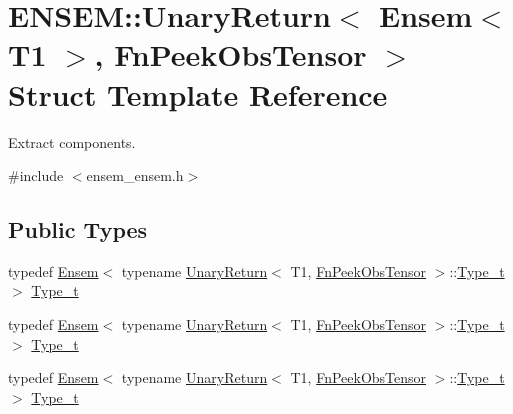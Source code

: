 \hypertarget{structENSEM_1_1UnaryReturn_3_01Ensem_3_01T1_01_4_00_01FnPeekObsTensor_01_4}{}\section{E\+N\+S\+EM\+:\+:Unary\+Return$<$ Ensem$<$ T1 $>$, Fn\+Peek\+Obs\+Tensor $>$ Struct Template Reference}
\label{structENSEM_1_1UnaryReturn_3_01Ensem_3_01T1_01_4_00_01FnPeekObsTensor_01_4}


Extract components.  




{\ttfamily \#include $<$ensem\+\_\+ensem.\+h$>$}

\subsection*{Public Types}
\begin{DoxyCompactItemize}
\item 
typedef \mbox{\hyperlink{classENSEM_1_1Ensem}{Ensem}}$<$ typename \mbox{\hyperlink{structENSEM_1_1UnaryReturn}{Unary\+Return}}$<$ T1, \mbox{\hyperlink{structENSEM_1_1FnPeekObsTensor}{Fn\+Peek\+Obs\+Tensor}} $>$\+::\mbox{\hyperlink{structENSEM_1_1UnaryReturn_3_01Ensem_3_01T1_01_4_00_01FnPeekObsTensor_01_4_a6f60fb6656ccc4fbc31cc64aa1face1f}{Type\+\_\+t}} $>$ \mbox{\hyperlink{structENSEM_1_1UnaryReturn_3_01Ensem_3_01T1_01_4_00_01FnPeekObsTensor_01_4_a6f60fb6656ccc4fbc31cc64aa1face1f}{Type\+\_\+t}}
\item 
typedef \mbox{\hyperlink{classENSEM_1_1Ensem}{Ensem}}$<$ typename \mbox{\hyperlink{structENSEM_1_1UnaryReturn}{Unary\+Return}}$<$ T1, \mbox{\hyperlink{structENSEM_1_1FnPeekObsTensor}{Fn\+Peek\+Obs\+Tensor}} $>$\+::\mbox{\hyperlink{structENSEM_1_1UnaryReturn_3_01Ensem_3_01T1_01_4_00_01FnPeekObsTensor_01_4_a6f60fb6656ccc4fbc31cc64aa1face1f}{Type\+\_\+t}} $>$ \mbox{\hyperlink{structENSEM_1_1UnaryReturn_3_01Ensem_3_01T1_01_4_00_01FnPeekObsTensor_01_4_a6f60fb6656ccc4fbc31cc64aa1face1f}{Type\+\_\+t}}
\item 
typedef \mbox{\hyperlink{classENSEM_1_1Ensem}{Ensem}}$<$ typename \mbox{\hyperlink{structENSEM_1_1UnaryReturn}{Unary\+Return}}$<$ T1, \mbox{\hyperlink{structENSEM_1_1FnPeekObsTensor}{Fn\+Peek\+Obs\+Tensor}} $>$\+::\mbox{\hyperlink{structENSEM_1_1UnaryReturn_3_01Ensem_3_01T1_01_4_00_01FnPeekObsTensor_01_4_a6f60fb6656ccc4fbc31cc64aa1face1f}{Type\+\_\+t}} $>$ \mbox{\hyperlink{structENSEM_1_1UnaryReturn_3_01Ensem_3_01T1_01_4_00_01FnPeekObsTensor_01_4_a6f60fb6656ccc4fbc31cc64aa1face1f}{Type\+\_\+t}}
\end{DoxyCompactItemize}


